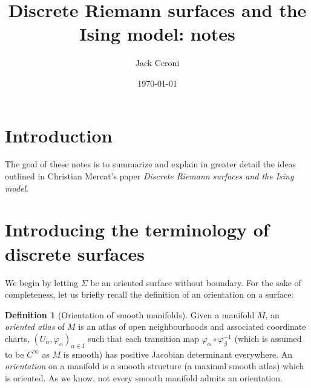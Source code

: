 \documentclass[aps,pra,showpacs,notitlepage,onecolumn,superscriptaddress,nofootinbib]{revtex4-1}
\theoremstyle{definition}
\newtheorem{definition}{Definition}[section]
\begin{document}
\title{Discrete Riemann surfaces and the Ising model: notes}
\author{Jack Ceroni}

\date{\today}

\maketitle

\section{Introduction}

\noindent The goal of these notes is to summarize and explain in greater detail the ideas outlined in Christian Mercat's paper \emph{Discrete Riemann surfaces and the Ising model}.

\section{Introducing the terminology of discrete surfaces}

\noindent We begin by letting $\Sigma$ be an oriented surface without boundary. For the sake of completeness, let us briefly recall the definition of an orientation on a surface:

\begin{definition}[Orientation of smooth manifolds]
  Given a manifold $M$, an \emph{oriented atlas} of $M$ is an atlas of open neighbourhoods and associated coordinate charts, $(U_{\alpha}, \varphi_{\alpha})_{\alpha \in I}$
  such that each transition map $\varphi_{\alpha} \circ \varphi_{\beta}^{-1}$ (which is assumed to be $C^{\infty}$ as $M$ is smooth) has positive Jacobian determinant everywhere.
  An \emph{orientation} on a manifold is a smooth structure (a maximal smooth atlas) which is oriented. As we know, not every smooth manifold admits an orientation.
\end{definition}
\end{document}
